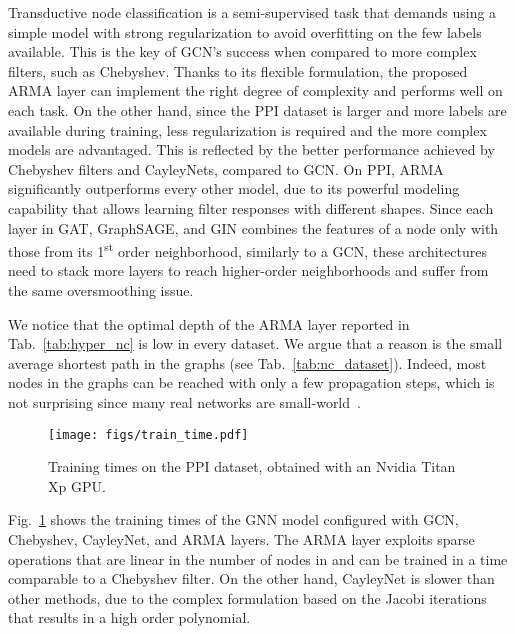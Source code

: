\documentclass{article}
\begin{document}
Transductive node classification is a semi-supervised task that demands using a simple model with strong regularization to avoid overfitting on the few labels available.
This is the key of GCN's success when compared to more complex filters, such as Chebyshev.
Thanks to its flexible formulation, the proposed ARMA layer can implement the right degree of complexity and performs well on each task. 
On the other hand, since the PPI dataset is larger and more labels are available during training, less regularization is required and the more complex models are advantaged. 
This is reflected by the better performance achieved by Chebyshev filters and CayleyNets, compared to GCN.
On PPI, ARMA significantly outperforms every other model, due to its powerful modeling capability that allows learning filter responses with different shapes.
Since each layer in GAT, GraphSAGE, and GIN combines the features of a node only with those from its 1\textsuperscript{st} order neighborhood, similarly to a GCN, these architectures need to stack more layers to reach higher-order neighborhoods and suffer from the same oversmoothing issue.

We notice that the optimal depth  of the ARMA layer reported in Tab.~\ref{tab:hyper_nc} is low in every dataset.
We argue that a reason is the small average shortest path in the graphs (see Tab.~\ref{tab:nc_dataset}).
Indeed, most nodes in the graphs can be reached with only a few propagation steps, which is not surprising since many real networks are small-world~\cite{watts1998collective}.

\begin{figure}[!ht]
	\centering
	\caption{Training times on the PPI dataset, obtained with an Nvidia Titan Xp GPU.}
	\texttt{[image: figs/train\_time.pdf]}	
	\label{fig:train_time}
\end{figure}

Fig.~\ref{fig:train_time} shows the training times of the GNN model configured with GCN, Chebyshev, CayleyNet, and ARMA layers. 
The ARMA layer exploits sparse operations that are linear in the number of nodes in  and can be trained in a time comparable to a Chebyshev filter.
On the other hand, CayleyNet is slower than other methods, due to the complex formulation based on the Jacobi iterations that results in a high order polynomial. 
\end{document}
